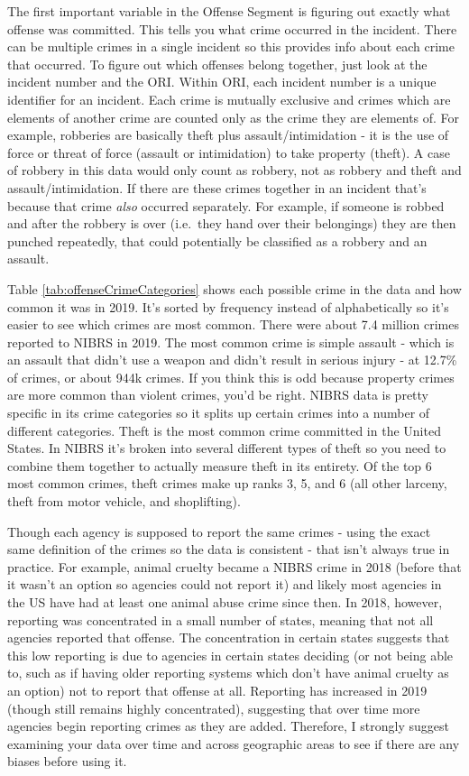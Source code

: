 \documentclass[
]{krantz}
\begin{document}
The first important variable in the Offense Segment is
figuring out exactly what offense was committed. This tells
you what crime occurred in the incident. There can be
multiple crimes in a single incident so this provides info
about each crime that occurred. To figure out which offenses
belong together, just look at the incident number and the
ORI. Within ORI, each incident number is a unique identifier
for an incident. Each crime is mutually exclusive and crimes
which are elements of another crime are counted only as the
crime they are elements of. For example, robberies are
basically theft plus assault/intimidation - it is the use of
force or threat of force (assault or intimidation) to take
property (theft). A case of robbery in this data would only
count as robbery, not as robbery and theft and
assault/intimidation. If there are these crimes together in
an incident that's because that crime \emph{also} occurred
separately. For example, if someone is robbed and after the
robbery is over (i.e.~they hand over their belongings) they
are then punched repeatedly, that could potentially be
classified as a robbery and an assault.

Table \ref{tab:offenseCrimeCategories} shows each possible
crime in the data and how common it was in 2019. It's sorted
by frequency instead of alphabetically so it's easier to see
which crimes are most common. There were about 7.4 million
crimes reported to NIBRS in 2019. The most common crime is
simple assault - which is an assault that didn't use a
weapon and didn't result in serious injury - at 12.7\% of
crimes, or about 944k crimes. If you think this is odd
because property crimes are more common than violent crimes,
you'd be right. NIBRS data is pretty specific in its crime
categories so it splits up certain crimes into a number of
different categories. Theft is the most common crime
committed in the United States. In NIBRS it's broken into
several different types of theft so you need to combine them
together to actually measure theft in its entirety. Of the
top 6 most common crimes, theft crimes make up ranks 3, 5,
and 6 (all other larceny, theft from motor vehicle, and
shoplifting).

Though each agency is supposed to report the same crimes -
using the exact same definition of the crimes so the data is
consistent - that isn't always true in practice. For
example, animal cruelty became a NIBRS crime in 2018 (before
that it wasn't an option so agencies could not report it)
and likely most agencies in the US have had at least one
animal abuse crime since then. In 2018, however, reporting
was concentrated in a small number of states, meaning that
not all agencies reported that offense. The concentration in
certain states suggests that this low reporting is due to
agencies in certain states deciding (or not being able to,
such as if having older reporting systems which don't have
animal cruelty as an option) not to report that offense at
all. Reporting has increased in 2019 (though still remains
highly concentrated), suggesting that over time more
agencies begin reporting crimes as they are added.
Therefore, I strongly suggest examining your data over time
and across geographic areas to see if there are any biases
before using it.
\end{document}
